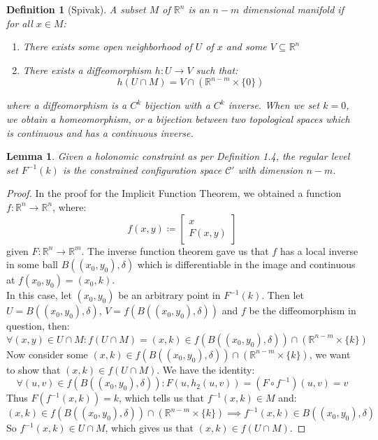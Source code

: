 \documentclass[10pt,letterpaper]{article} %
\newtheorem{lem}{Lemma}[section]
\newtheorem{defn}{Definition}[section]
\begin{document}
\begin{defn}[Spivak]
A subset $M$ of $\mathbb{R}^n$ is an $n-m$ dimensional manifold if for all $x \in M$:
\begin{enumerate}
\item There exists some open neighborhood of $U$ of $x$ and some $V \subseteq \mathbb{R}^n$
\item There exists a diffeomorphism $h: U \xrightarrow{} V$ such that:
\begin{equation*}
h(U \cap M) = V \cap (\mathbb{R}^{n-m} \times \{0\})
\end{equation*}
\end{enumerate}
where a diffeomorphism is a $C^k$ bijection with a $C^k$ inverse. When we set $k= 0$, we obtain a homeomorphism, or a bijection between two topological spaces which is continuous and has a continuous inverse.
\end{defn}
\begin{lem}
Given a holonomic constraint as per Definition 1.4, the regular level set $F^{-1}(k)$ is the constrained configuration space $\mathcal{C}'$ with dimension $n-m$.
\end{lem}
\begin{proof}
In the proof for the Implicit Function Theorem, we obtained a function $f: \mathbb{R}^n \xrightarrow{} \mathbb{R}^n$, where:
\begin{equation*}
f(x, y) \coloneq \begin{bmatrix}
x\\F(x, y)
\end{bmatrix}
\end{equation*}
given $F: \mathbb{R}^n \xrightarrow{} \mathbb{R}^m$. The inverse function theorem gave us that $f$ has a local inverse in some ball $B((x_0, y_0), \delta)$ which is differentiable in the image and continuous at $f(x_0, y_0) = (x_0, k)$.\\

In this case, let $(x_0, y_0)$ be an arbitrary point in $F^{-1}(k)$. Then let $U = B((x_0, y_0), \delta)$, $V = f(B((x_0, y_0), \delta))$ and $f$ be the diffeomorphism in question, then:
\begin{equation*}
\forall (x, y) \in U \cap M: f(U \cap M) = (x, k) \in f(B((x_0, y_0), \delta)) \cap (\mathbb{R}^{n-m} \times \{k\})
\end{equation*}
Now consider some $(x, k) \in f(B((x_0, y_0), \delta)) \cap (\mathbb{R}^{n-m} \times \{k\})$, we want to show that $(x, k) \in f(U \cap M)$. We have the identity:
\begin{equation*}
\forall (u, v) \in f(B((x_0, y_0), \delta)): F(u, h_2(u, v)) = (F \circ f^{-1})(u, v) = v
\end{equation*}
Thus $F(f^{-1}(x, k)) = k$, which tells us that $f^{-1}(x, k) \in M$ and:
\begin{equation*}
(x, k) \in f(B((x_0, y_0), \delta)) \cap (\mathbb{R}^{n-m} \times \{k\}) \implies f^{-1}(x, k) \in B((x_0, y_0), \delta)
\end{equation*}
So $f^{-1}(x, k) \in U \cap M$, which gives us that $(x, k) \in f(U \cap M)$.
\end{proof}
\end{document}
